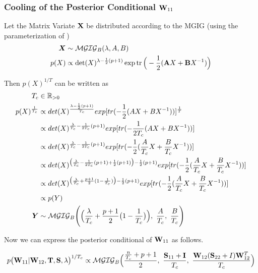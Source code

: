 \subsubsection{Cooling of the Posterior Conditional $\Wxx$}
Let the Matrix Variate $\mathbf{X}$ be distributed according to the \gls{MGIG} (using the parameterization of \citet{butler_generalized_1998})
\begin{align*}
\bm{X} &\sim \mathcal{MGIG}_B(\lambda, A, B) \\
p({X}) &\propto \det({X})^{\lambda - \frac{1}{2}(p+1)}
\exp \operatorname{tr}
\Big(
-\frac{1}{2} (\mathbf{A}{X} + \mathbf{B} {X}^{-1} )
\Big)
\end{align*}

Then $p(X)^{1/T}$ can be written as
\begin{align*}
\Tc &\in \mathbb{R}_{>0}
\\
p(X)^{\frac{1}{\Tc}}
&\propto det(X)^{\frac{{\lambda - \frac{1}{2}(p+1)}}{\Tc}} exp \lbrack tr(-\frac{1}{2}(AX + BX^{-1} ))\rbrack^{\frac{1}{T}}
\\
&\propto det(X)^{\frac{\lambda}{\Tc} - \frac{1}{2\Tc}(p+1)} exp \lbrack tr(-\frac{1}{2\Tc}(AX + BX^{-1} ))\rbrack
\\
&\propto det(X)^{\frac{\lambda}{\Tc} - \frac{1}{2\Tc}(p+1)} exp \lbrack tr(-\frac{1}{2}(\frac{A}{\Tc}X + \frac{B}{\Tc}X^{-1} ))\rbrack
\\
&\propto det(X)^{\big({\frac{\lambda}{\Tc} - \frac{1}{2\Tc}(p+1)} + \frac{1}{2}(p+1)\big) - \frac{1}{2}(p+1)} exp \lbrack tr(-\frac{1}{2}(\frac{A}{\Tc}X + \frac{B}{\Tc}X^{-1} ))\rbrack
\\
&\propto det(X)^{\big(\frac{\lambda}{\Tc} + \frac{p+1}{2}(1-\frac{1}{\Tc})\big) - \frac{1}{2}(p+1)} exp \lbrack tr(-\frac{1}{2}(\frac{A}{\Tc}X + \frac{B}{\Tc}X^{-1} ))\rbrack
\\
&\propto p(Y) 
\\
\bm{Y} &\sim \mathcal{MGIG}_B\Bigg(\Big(\frac{\lambda}{\Tc} + \frac{p+1}{2}\big(1-\frac{1}{\Tc}\big)\Big), \ \frac{A}{\Tc},\ \frac{B}{\Tc}\Bigg)
\end{align*}

Now we can express the posterior conditional of $\Wxx$ as follows.

\begin{tcolorbox}[colback=red!5!white,colframe=red!60!black, title=Cooled Posterior Conditional of $\Wxx$]
	\begin{align}
		p\big(\Wxx | \Wxy, \matr{T}, \matr{S}, \lambda\big)^{1/\Tc} \propto 
		\mathcal{MGIG}_B
		\Big(
		\frac{\frac{n}{\Tc}+p+1}{2}, \ 
		\frac{\Sxx+\matr{I}}{\Tc},\  
		\frac{\Wxy(\Syy+I)\Wxy^T}{\Tc}
		\Big)
	\end{align}
\end{tcolorbox}

